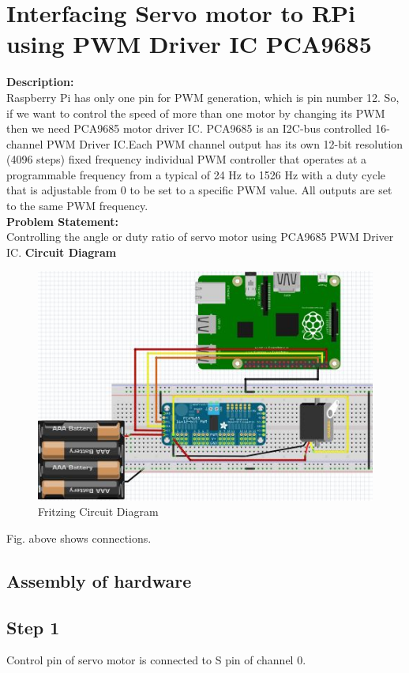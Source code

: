 \documentclass[a4paper,12pt,oneside]{book}
\begin{document}
\section{Interfacing Servo motor to RPi using PWM Driver IC PCA9685}
\textbf{Description:} \\
Raspberry Pi has only one pin for PWM generation, which is pin number 12. So, if 
we want to control the speed of more than one motor by changing its PWM then we 
need PCA9685 motor driver IC.
PCA9685 is an I2C-bus controlled 16-channel PWM Driver IC.Each PWM channel output 
has its own 12-bit resolution (4096 steps) fixed frequency individual PWM 
controller that operates at a programmable frequency from a typical of 24 Hz 
to 1526 Hz with a duty cycle that is adjustable from 0%
to be set to a specific PWM value. All outputs are set to the same PWM frequency.\\
\textbf{Problem Statement:} \\
Controlling the angle or duty ratio of servo motor using PCA9685 PWM Driver IC.
\newpage
\textbf{Circuit Diagram}\\
\begin{figure}[H]
    \centering
    \includegraphics[scale=0.6]{servo_motor_PCA9685}
    \caption{Fritzing Circuit Diagram}
\end{figure}
Fig. above shows connections.
\subsection*{Assembly of hardware}
\subsection*{Step 1}
Control pin of servo motor is connected to S pin of channel 0.
\end{document}
